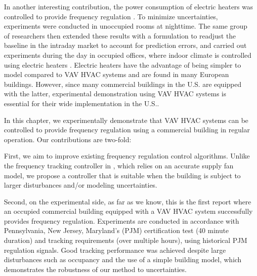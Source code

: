 In another interesting contribution, the power consumption of electric heaters was %
controlled to provide frequency regulation \cite{Fabietti:2016exp}. 
To minimize uncertainties, experiments were conducted in unoccupied rooms at nighttime.
The same group of researchers then extended these results with a formulation to readjust the baseline in the intraday market to account for prediction errors, and carried out experiments during the day in occupied offices, where indoor climate is controlled using electric heaters \cite{Gorecki:2017exp}.
Electric heaters have the advantage of being simpler to model compared to VAV HVAC systems and are found in many European buildings.
However, since many commercial buildings in the U.S. are equipped with the latter, experimental demonstration using VAV HVAC systems is essential for their wide implementation in the U.S..


In this chapter, we experimentally demonstrate that VAV HVAC systems can be controlled to provide frequency regulation using a commercial building in regular operation.
Our contributions are two-fold:


First, we aim to improve existing frequency regulation control algorithms.
Unlike the frequency tracking controller in \cite{Vrettos:2016flexlab1}, which relies on an accurate supply fan model, we propose a controller that is suitable when the building is subject to larger disturbances and/or modeling uncertainties. 

Second, on the experimental side, as far as we know, this is the first report where an occupied commercial building equipped with a VAV HVAC system successfully provides frequency regulation.
Experiments are conducted in accordance with Pennsylvania, New Jersey, Maryland's (PJM) certification test (40 minute duration) and tracking requirements (over multiple hours), using historical PJM regulation signals.  
Good tracking performance was achieved despite large disturbances such as occupancy and the use of a simple building model, which demonstrates the robustness of our method to uncertainties.

